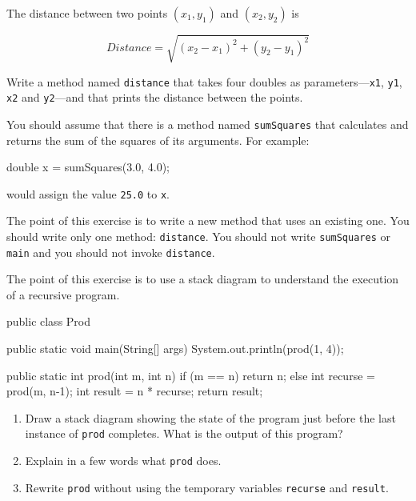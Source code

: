 \documentclass[12pt]{book}
\begin{document}
\begin{exercise}
The distance between two points $(x_1, y_1)$ and $(x_2, y_2)$ is

\[ Distance = \sqrt{(x_2 - x_1)^2 +(y_2 - y_1)^2} \]

Write a method named {\tt distance} that takes four doubles as parameters---{\tt x1}, {\tt y1}, {\tt x2} and {\tt y2}---and that prints the distance between the points.

You should assume that there is a method named {\tt sumSquares} that calculates and returns the sum of the squares of its arguments.
For example:

\begin{code}
    double x = sumSquares(3.0, 4.0);
\end{code}

would assign the value {\tt 25.0} to {\tt x}.

The point of this exercise is to write a new method that uses an existing one.
You should write only one method: {\tt distance}.
You should not write {\tt sumSquares} or {\tt main} and you should not invoke {\tt distance}.
\end{exercise}

\begin{exercise}
The point of this exercise is to use a stack diagram to understand the execution of a recursive program.

\begin{code}
public class Prod {

    public static void main(String[] args) {
        System.out.println(prod(1, 4));
    }

    public static int prod(int m, int n) {
        if (m == n) {
            return n;
        } else {
            int recurse = prod(m, n-1);
            int result = n * recurse;
            return result;
        }
    }
}
\end{code}

\begin{enumerate}

\item Draw a stack diagram showing the state of the program just before the last instance of {\tt prod} completes.
What is the output of this program?

\item Explain in a few words what {\tt prod} does.

\item Rewrite {\tt prod} without using the temporary variables {\tt recurse} and {\tt result}.

\end{enumerate}
\end{exercise}
\end{document}
